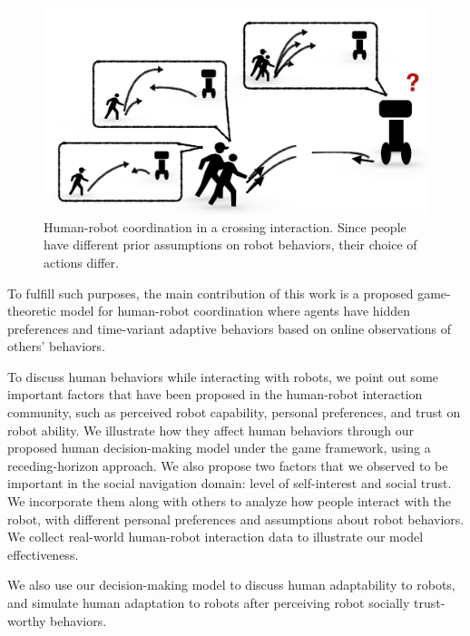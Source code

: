 \documentclass[letterpaper, 10 pt, conference]{ieeeconf}  %
\begin{document}
   \begin{figure}[t]
      \centering
      \vspace{-1em}
      \includegraphics[scale=0.32]{intro}
      \vspace{-1.5em}
      \caption{Human-robot coordination in a crossing interaction. Since 
      people have different prior assumptions on robot behaviors, their choice 
      of actions differ.}
      \vspace{-2em}
    \label{fig:intro}
   \end{figure}
To fulfill such purposes, the main contribution of this work is a proposed game-theoretic 
model for human-robot coordination where agents have hidden preferences and time-variant adaptive behaviors based 
on online observations of others' behaviors.

To discuss human behaviors while interacting with robots, we point out some
important factors that have been proposed in the human-robot interaction 
community, such as perceived robot capability, personal preferences, and 
trust on robot ability. We illustrate how they affect human behaviors through 
our proposed human decision-making model under the game framework, using a 
receding-horizon approach. We also propose two factors that we observed to be 
important in the social navigation 
domain: level of self-interest and social trust. We incorporate them along 
with others to analyze how people interact with the robot, with different 
personal preferences and assumptions about robot 
behaviors. We collect real-world human-robot interaction data to 
illustrate our model effectiveness. 

We also use our decision-making model to discuss human adaptability to robots,
and simulate human adaptation to robots after perceiving robot 
socially trust-worthy behaviors. 
\end{document}
